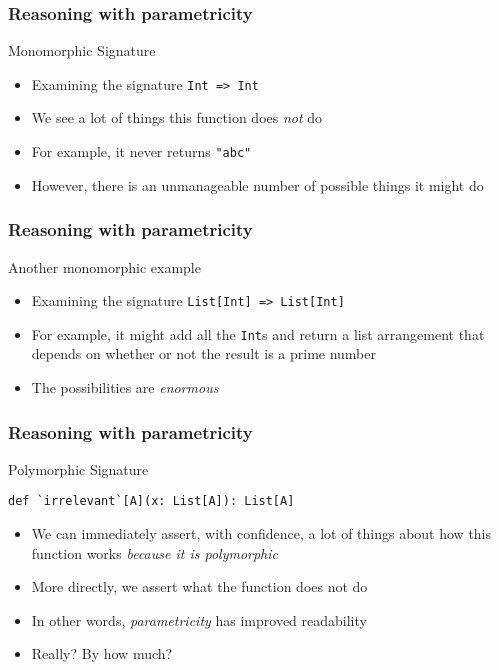 \begin{frame}[fragile]
\frametitle{Reasoning with parametricity}
\begin{block}{Monomorphic Signature}
\begin{itemize}
  \item Examining the signature \lstinline[style=scala]{Int => Int}
  \item We see a lot of things this function does \emph{not} do
  \item For example, it never returns \lstinline[style=scala]{"abc"}
  \item However, there is an unmanageable number of possible things it might do
\end{itemize}
\end{block}
\end{frame}

\begin{frame}[fragile]
\frametitle{Reasoning with parametricity}
\begin{block}{Another monomorphic example}
\begin{itemize}
  \item Examining the signature \lstinline[style=scala]{List[Int] => List[Int]}
  \item For example, it might add all the \lstinline{Int}s and return a list arrangement that depends on whether or not the result is a prime number
  \item The possibilities are \emph{enormous}
\end{itemize}
\end{block}
\end{frame}

\begin{frame}[fragile]
\frametitle{Reasoning with parametricity}
\begin{block}{Polymorphic Signature}
\begin{lstlisting}[style=scala]
def `irrelevant`[A](x: List[A]): List[A]
\end{lstlisting}
\begin{itemize}
  \item We can immediately assert, with confidence, a lot of things about how this function works \emph{because it is polymorphic}
  \item More directly, we assert what the function does not do
  \item<2> In other words, \emph{parametricity} has improved readability
  \item<2> Really? By how much?
\end{itemize}
\end{block}
\end{frame}

